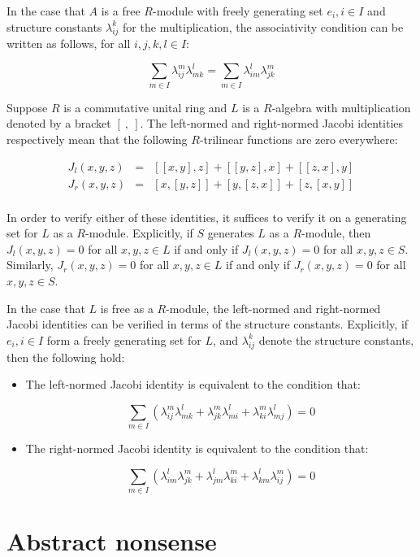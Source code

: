 In the case that $A$ is a free $R$-module with freely generating set
$e_i, i \in I$ and structure constants $\lambda_{ij}^k$ for the
multiplication, the associativity condition can be written as follows,
for all $i,j,k,l \in I$:

$$\sum_{m \in I} \lambda_{ij}^m\lambda_{mk}^l = \sum_{m \in I} \lambda_{im}^l \lambda_{jk}^m$$

Suppose $R$ is a commutative unital ring and $L$ is a $R$-algebra with
multiplication denoted by a bracket $[ \ , \ ]$. The left-normed and
right-normed Jacobi identities respectively mean that the following
$R$-trilinear functions are zero everywhere:

\begin{eqnarray*}
  J_l(x,y,z) & = & [[x,y],z] + [[y,z],x] + [[z,x],y]\\
  J_r(x,y,z) & = & [x,[y,z]] + [y,[z,x]] + [z,[x,y]]\\
\end{eqnarray*}

In order to verify either of these identities, it suffices to verify
it on a generating set for $L$ as a $R$-module. Explicitly, if $S$
generates $L$ as a $R$-module, then $J_l(x,y,z) = 0$ for all $x,y,z
\in L$ if and only if $J_l(x,y,z) = 0$ for all $x,y,z \in
S$. Similarly, $J_r(x,y,z) = 0$ for all $x,y,z \in L$ if and only if
$J_r(x,y,z) = 0$ for all $x,y,z \in S$.

In the case that $L$ is free as a $R$-module, the left-normed and
right-normed Jacobi identities can be verified in terms of the
structure constants. Explicitly, if $e_i, i \in I$ form a freely
generating set for $L$, and $\lambda_{ij}^k$ denote the structure
constants, then the following hold:

\begin{itemize}
\item The left-normed Jacobi identity is equivalent to the condition that:

  $$\sum_{m \in I} (\lambda_{ij}^m\lambda_{mk}^l + \lambda_{jk}^m\lambda_{mi}^l + \lambda_{ki}^m\lambda_{mj}^l) = 0$$

\item The right-normed Jacobi identity is equivalent to the condition
  that:

  $$\sum_{m \in I} (\lambda_{im}^l\lambda_{jk}^m + \lambda_{jm}^l\lambda_{ki}^m + \lambda_{km}^l\lambda_{ij}^m) = 0$$
\end{itemize}


\section{Abstract nonsense}\label{appsec:abstract-nonsense}

